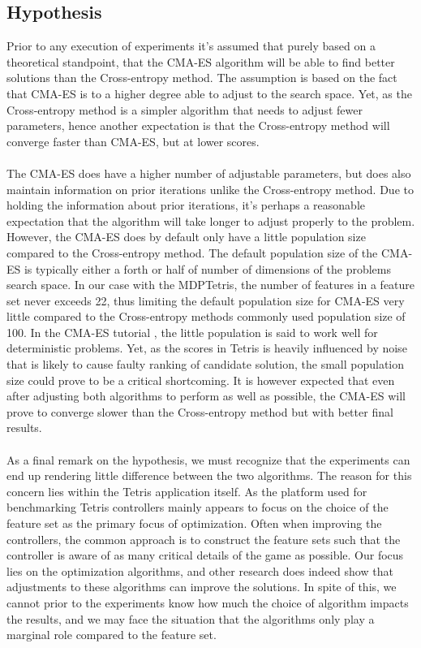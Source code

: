 \subsection{Hypothesis}

Prior to any execution of experiments it's assumed that purely based 
on a theoretical standpoint, that the CMA-ES algorithm will be able to 
find better solutions than the Cross-entropy method. The assumption is based 
on the fact that CMA-ES is to a higher degree able to adjust to the 
search space. Yet, as the Cross-entropy method is a simpler algorithm that needs 
to adjust fewer parameters, hence another expectation is that the Cross-entropy
method will converge faster than CMA-ES, but at lower scores.\\
\\
The CMA-ES does have a higher number of adjustable parameters, but does also
maintain information on prior iterations unlike the Cross-entropy method.
Due to holding the information about prior iterations, it's perhaps a reasonable
expectation that the algorithm will take longer to adjust properly to the
problem. However, the CMA-ES does by default only have a little population size 
compared to the Cross-entropy method. The default population size of the CMA-ES is
typically either a forth or half of number of dimensions of the problems search space.
In our case with the MDPTetris, the number of features in a feature set never exceeds
22,
thus limiting the default population size for CMA-ES very little compared to the Cross-entropy methods commonly used 
population size of 100. In the CMA-ES tutorial \citep{hansen2011}, the little population is said to
work well for deterministic problems. Yet, as the scores in Tetris is heavily
influenced by noise that is likely to cause faulty ranking of candidate solution,
the small population size could prove to be a critical shortcoming.
It is however expected that even after adjusting both algorithms to perform as 
well as possible, the CMA-ES will prove to converge slower than the Cross-entropy method but
with better final results.\\
\\
As a final remark on the hypothesis, we must recognize that the experiments can 
end up rendering little difference between the two algorithms. The reason for 
this concern lies within the Tetris application itself. As the platform used for benchmarking 
Tetris controllers mainly appears to focus on the choice of the feature set as the primary
focus of optimization. Often when improving the controllers, the common approach is to
construct the feature sets such that the controller is aware of as many critical 
details of the game as possible. Our focus lies on the optimization algorithms,
and other research does indeed show that adjustments to these algorithms can 
improve the solutions. In spite of this, we cannot prior to the experiments know how much
the choice of algorithm impacts the results, and we may face the situation that 
the algorithms only play a marginal role compared to the feature set.
